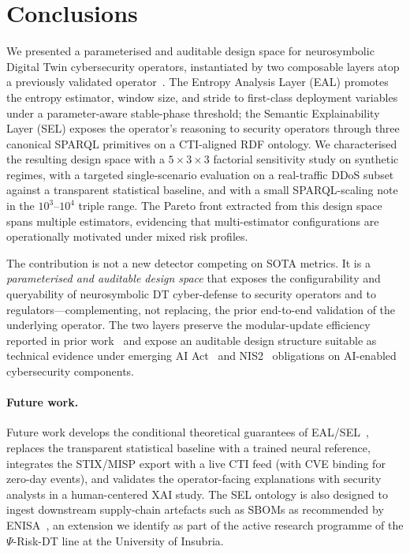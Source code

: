 \documentclass[futureinternet,article,submit,pdftex,moreauthors]{Definitions/mdpi}
\newcommand{\psiop}{\ensuremath{\Psi}}
\begin{document}
\section{Conclusions}
\label{sec:conclusion}

We presented a parameterised and auditable design space for
neurosymbolic Digital Twin cybersecurity operators, instantiated by two
composable layers atop a previously validated operator~\cite{paper3}.
The Entropy Analysis Layer (EAL) promotes the entropy estimator, window
size, and stride to first-class deployment variables under a
parameter-aware stable-phase threshold; the Semantic Explainability
Layer (SEL) exposes the operator's reasoning to security operators
through three canonical SPARQL primitives on a CTI-aligned RDF
ontology. We characterised the resulting design space with a
$5\times 3\times 3$ factorial sensitivity study on synthetic regimes,
with a targeted single-scenario evaluation on a real-traffic DDoS
subset against a transparent statistical baseline, and with a small
SPARQL-scaling note in the $10^{3}$--$10^{4}$ triple range. The Pareto
front extracted from this design space spans multiple estimators,
evidencing that multi-estimator configurations are operationally
motivated under mixed risk profiles.

\medskip

The contribution is not a new detector competing on SOTA metrics. It is
a \emph{parameterised and auditable design space} that exposes the
configurability and queryability of neurosymbolic DT cyber-defense to
security operators and to regulators---complementing, not replacing,
the prior end-to-end validation of the underlying operator. The two
layers preserve the modular-update efficiency reported in prior
work~\cite{paper3} and expose an auditable design structure suitable as
technical evidence under emerging AI Act~\cite{aiact} and
NIS2~\cite{nis2} obligations on AI-enabled cybersecurity components.

\paragraph{Future work.} Future work develops the conditional
theoretical guarantees of EAL/SEL~\cite{paper5}, replaces the
transparent statistical baseline with a trained neural reference,
integrates the STIX/MISP export with a live CTI feed (with CVE binding
for zero-day events), and validates the operator-facing explanations
with security analysts in a human-centered XAI study. The SEL ontology
is also designed to ingest downstream supply-chain artefacts such as
SBOMs as recommended by ENISA~\cite{enisasbom}, an extension we identify
as part of the active research programme of the $\psiop$-Risk-DT line
at the University of Insubria.
\end{document}
